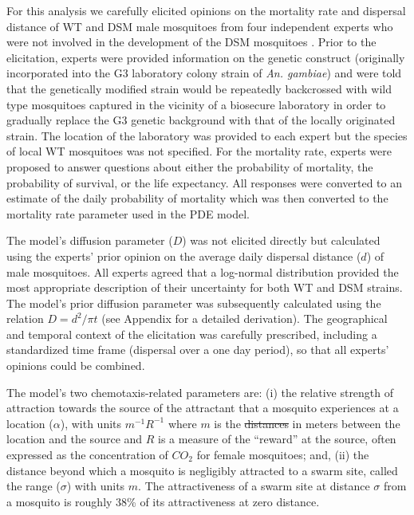 \documentclass[]{bmcart}
\newcommand{\va}{{\alpha}}
\newcommand{\vd}{{D}}
\providecommand{\DIFaddtex}[1]{{\protect\color{blue}\uwave{#1}}} %
\providecommand{\DIFdeltex}[1]{{\protect\color{red}\sout{#1}}}                      %
\providecommand{\DIFaddbegin}{} %
\providecommand{\DIFaddend}{} %
\providecommand{\DIFdelbegin}{} %
\providecommand{\DIFdelend}{} %
\providecommand{\DIFadd}[1]{\texorpdfstring{\DIFaddtex{#1}}{#1}} %
\providecommand{\DIFdel}[1]{\texorpdfstring{\DIFdeltex{#1}}{}} %
\newcommand{\DIFscaledelfig}{0.5}
\newlength{\DIFdelgraphicswidth} %
\newlength{\DIFdelgraphicsheight} %
\newcommand{\DIFaddincludegraphics}[2][]{{\color{blue}\fbox{\DIFOincludegraphics[#1]{#2}}}} %
\newcommand{\DIFdelincludegraphics}[2][]{%
\sbox{\DIFdelgraphicsbox}{\DIFOincludegraphics[#1]{#2}}%
\settoboxwidth{\DIFdelgraphicswidth}{\DIFdelgraphicsbox} %
\settoboxtotalheight{\DIFdelgraphicsheight}{\DIFdelgraphicsbox} %
\scalebox{\DIFscaledelfig}{%
\parbox[b]{\DIFdelgraphicswidth}{\usebox{\DIFdelgraphicsbox}\\[-\baselineskip] \rule{\DIFdelgraphicswidth}{0em}}\llap{\resizebox{\DIFdelgraphicswidth}{\DIFdelgraphicsheight}{%
\setlength{\unitlength}{\DIFdelgraphicswidth}%
\begin{picture}(1,1)%
\thicklines\linethickness{2pt} %
{\color[rgb]{1,0,0}\put(0,0){\framebox(1,1){}}}%
{\color[rgb]{1,0,0}\put(0,0){\line( 1,1){1}}}%
{\color[rgb]{1,0,0}\put(0,1){\line(1,-1){1}}}%
\end{picture}%
}\hspace*{3pt}}} %
} %
\DeclareRobustCommand{\DIFaddbegin}{\DIFOaddbegin \let\includegraphics\DIFaddincludegraphics} %
\DeclareRobustCommand{\DIFaddend}{\DIFOaddend \let\includegraphics\DIFOincludegraphics} %
\DeclareRobustCommand{\DIFdelbegin}{\DIFOdelbegin \let\includegraphics\DIFdelincludegraphics} %
\DeclareRobustCommand{\DIFdelend}{\DIFOaddend \let\includegraphics\DIFOincludegraphics} %
\begin{document}
For this analysis we carefully elicited opinions on the mortality rate and dispersal distance of WT and DSM male mosquitoes from four independent experts who were not involved in the development of the DSM mosquitoes \cite{Hayes2015a}. Prior to the elicitation, experts were provided information on the genetic construct (originally incorporated into the G3 laboratory colony strain of \textit{An. gambiae}) and were told that the genetically modified strain would be repeatedly backcrossed with wild type mosquitoes captured in the vicinity of a biosecure laboratory in order to gradually replace the G3 genetic background with that of the locally originated strain. The location of the laboratory was provided to each expert but the species of local WT mosquitoes was not specified. For the mortality rate, experts were proposed to answer questions about either the probability of mortality, the probability of survival, or the life expectancy. All responses were converted to an estimate of the daily probability of mortality which was then converted to the mortality rate parameter used in the PDE model.

The model's diffusion parameter ($\vd$) was not elicited directly but calculated using the experts' prior opinion on the average daily dispersal distance ($d$) of male mosquitoes. All experts agreed that a log-normal distribution provided the most appropriate description of their uncertainty for both WT and DSM strains. The model's prior diffusion parameter was subsequently calculated using the relation $\vd = d^2/\pi t$ (see Appendix for a detailed derivation). The geographical and temporal context of the elicitation was carefully prescribed, including a standardized time frame (dispersal over a one day period), so that all experts' opinions could be combined.

The model's two chemotaxis-related parameters are: (i) the relative strength of attraction towards the source of the attractant that a mosquito experiences at a location ($\va$), with units $m^{-1} R^{-1}$ where $m$ is the \DIFdelbegin \DIFdel{distances }\DIFdelend \DIFaddbegin \DIFadd{distance }\DIFaddend in meters between the location and the source and $R$ is a measure of the ``reward'' at the source, often expressed as the concentration of $CO_2$ for female mosquitoes; and, (ii) the distance beyond which a mosquito is negligibly attracted to a swarm site, called the range ($\sigma$) with units $m$. The attractiveness of a swarm site at distance $\sigma$ from a mosquito is roughly 38\% of its attractiveness at zero distance.
\end{document}
